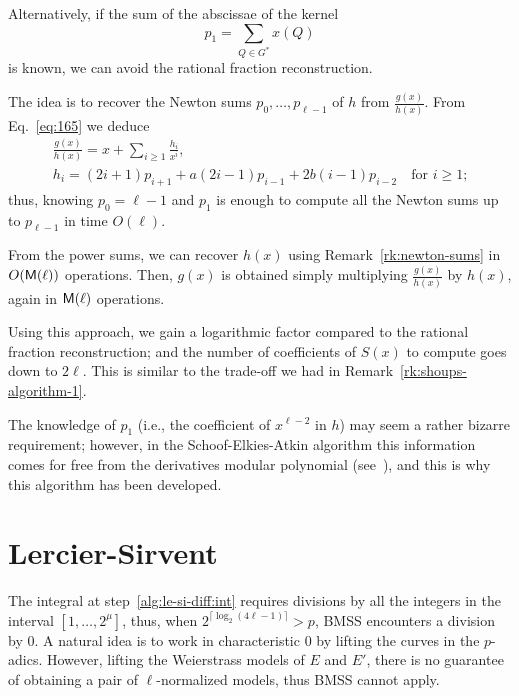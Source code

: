 \begin{remark}
  \label{rk:bmss}
  Alternatively, if the sum of the abscissae of the kernel
  \begin{equation}
    \label{eq:182}
    p_1 = \sum_{Q\in G^\ast}x(Q)
  \end{equation}
  is known, we can avoid the rational fraction reconstruction.

  The idea is to recover the Newton sums $p_0,\ldots,p_{\ell-1}$ of
  $h$ from $\frac{g(x)}{h(x)}$. From Eq.~\eqref{eq:165} we deduce
  \begin{equation}
    \label{eq:181}
    \begin{gathered}
      \frac{g(x)}{h(x)} = x + \sum_{i\ge1}\frac{h_i}{x^i}\text{,}\\
      h_i = (2i+1)p_{i+1} + a(2i-1)p_{i-1} + 2b(i-1)p_{i-2}
      \quad\text{for $i\ge1$;}
    \end{gathered}
  \end{equation}
  thus, knowing $p_0=\ell-1$ and $p_1$ is enough to compute all the
  Newton sums up to $p_{\ell-1}$ in time $O(\ell)$.

  From the power sums, we can recover $h(x)$ using
  Remark~\ref{rk:newton-sums} in $O(\mathsf{M}(\ell))$ operations. Then,
  $g(x)$ is obtained simply multiplying $\frac{g(x)}{h(x)}$ by $h(x)$,
  again in $\mathsf{M}(\ell)$ operations.

  Using this approach, we gain a logarithmic factor compared to the
  rational fraction reconstruction; and the number of coefficients of
  $S(x)$ to compute goes down to $2\ell$. This is similar to the
  trade-off we had in Remark~\ref{rk:shoups-algorithm-1}.

  The knowledge of $p_1$ (i.e., the coefficient of $x^{\ell-2}$ in
  $h$) may seem a rather bizarre requirement; however, in the
  Schoof-Elkies-Atkin algorithm this information comes for free from
  the derivatives modular polynomial (see~\cite{elkies98,morain95}),
  and this is why this algorithm has been developed.
\end{remark}



\section{Lercier-Sirvent}
\label{sec:lercier-sirvent}
The integral at step~\ref{alg:le-si-diff:int} requires divisions by
all the integers in the interval $[1,\ldots,2^\mu]$, thus, when
$2^{\lceil\log_2(4\ell-1)\rceil}>p$,  BMSS encounters a division by
$0$. A natural idea is to work in characteristic $0$ by lifting the
curves in the $p$-adics. However, lifting the Weierstrass models of
$E$ and $E'$, there is no guarantee of obtaining a pair of
$\ell$-normalized models, thus BMSS cannot apply.

